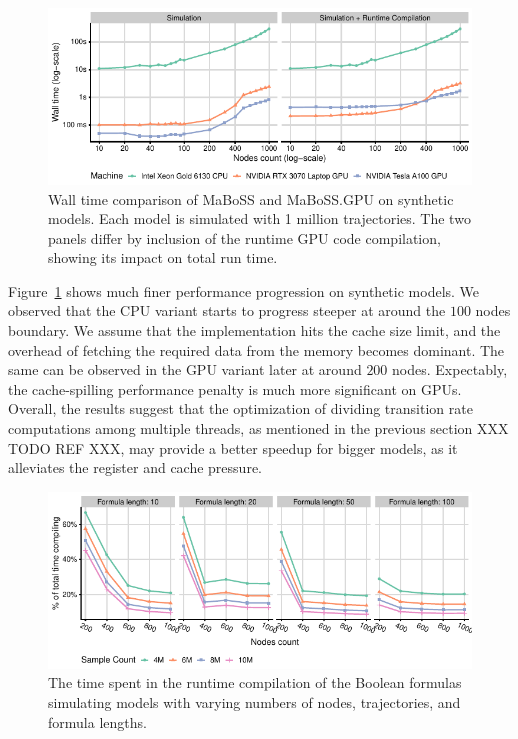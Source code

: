 \documentclass[a4paper,num-refs]{oup-contemporary}
\begin{document}
\begin{figure}
    \centering
    \includegraphics[width=\linewidth]{Figures/nodes.pdf}
    \caption{Wall time comparison of MaBoSS and MaBoSS.GPU on synthetic models. Each model is simulated with 1 million trajectories. The two panels differ by inclusion of the runtime GPU code compilation, showing its impact on total run time.}
    \label{fig:synth}
\end{figure}

Figure~\ref{fig:synth} shows much finer performance progression on synthetic models. We observed that the CPU variant starts to progress steeper at around the $100$ nodes boundary. We assume that the implementation hits the cache size limit, and the overhead of fetching the required data from the memory becomes dominant. The same can be observed in the GPU variant later at around $200$ nodes. Expectably, the cache-spilling performance penalty is much more significant on GPUs. Overall, the results suggest that the optimization of dividing transition rate computations among multiple threads, as mentioned in the previous section XXX TODO REF XXX, may provide a better speedup for bigger models, as it alleviates the register and cache pressure.

\begin{figure}
    \centering
    \includegraphics[width=\linewidth]{Figures/nodes-compilation-big-NVIDIA Tesla A100 GPU.pdf}
    \caption{The time spent in the runtime compilation of the Boolean formulas simulating models with varying numbers of nodes, trajectories, and formula lengths.}
    \label{fig:comp}
\end{figure}
\end{document}
